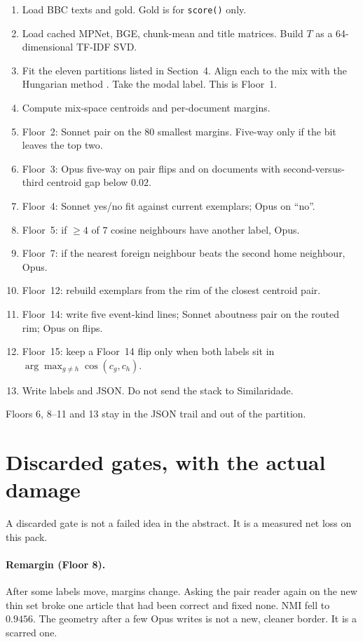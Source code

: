 \documentclass[11pt,a4paper]{article}
\begin{document}
\begin{enumerate}
\item Load BBC texts and gold. Gold is for \texttt{score()}
      only.
\item Load cached MPNet, BGE, chunk-mean and title matrices.
      Build $T$ as a 64-dimensional TF-IDF SVD.
\item Fit the eleven partitions listed in Section~4. Align
      each to the mix with the Hungarian method
      \cite{kuhn1955hungarian}. Take the modal label. This
      is Floor~1.
\item Compute mix-space centroids and per-document margins.
\item Floor~2: Sonnet pair on the $80$ smallest margins.
      Five-way only if the bit leaves the top two.
\item Floor~3: Opus five-way on pair flips and on documents
      with second-versus-third centroid gap below $0.02$.
\item Floor~4: Sonnet yes/no fit against current exemplars;
      Opus on ``no''.
\item Floor~5: if $\ge 4$ of $7$ cosine neighbours have
      another label, Opus.
\item Floor~7: if the nearest foreign neighbour beats the
      second home neighbour, Opus.
\item Floor~12: rebuild exemplars from the rim of the
      closest centroid pair.
\item Floor~14: write five event-kind lines; Sonnet
      aboutness pair on the routed rim; Opus on flips.
\item Floor~15: keep a Floor~14 flip only when both labels
      sit in $\arg\max_{g\neq h}\cos(c_g,c_h)$.
\item Write labels and JSON. Do not send the stack to
      Similaridade.
\end{enumerate}

Floors 6, 8--11 and 13 stay in the JSON trail and out of
the partition.

\section{Discarded gates, with the actual damage}

A discarded gate is not a failed idea in the abstract. It
is a measured net loss on this pack.

\paragraph{Remargin (Floor 8).}
After some labels move, margins change. Asking the pair
reader again on the new thin set broke one article that had
been correct and fixed none. NMI fell to $0.9456$. The
geometry after a few Opus writes is not a new, cleaner
border. It is a scarred one.
\end{document}

